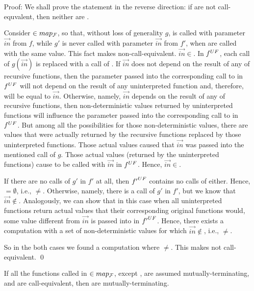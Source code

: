 \documentclass{llncs}
\begin{document}
Proof: We shall prove the statement in the reverse direction: if  are not call-equvalent, then neither are . 

Consider $\in map_{\cal F}$, so that, without loss of generality $g$, is called with parameter $\vec{in}$ from $f$, while $g'$ is never called with parameter $\vec{in}$ from $f'$, when  are called with the same value. This fact makes  non-call-equivalent. $\vec{in}\in$. In ${f}^{UF}$, each call of $g(\vec{in})$ is replaced with a call of . If $\vec{in}$ does not depend on the result of any of recursive functions, then the parameter passed into the corresponding call to  in ${f}^{UF}$ will not depend on the result of any uninterpreted function and, therefore, will be equal to $\vec{in}$. Otherwise, namely, $\vec{in}$ depends on the result of any of recursive functions, then non-deterministic values returned by uninterpreted functions will influence the parameter passed into the corresponding call to  in ${f}^{UF}$. But among all the possibilities for those non-deterministic values, there are values that were actually returned by the recursive functions replaced by those uninterpreted functions. Those actual values caused that $\vec{in}$ was passed into the mentioned call of $g$. Those actual values (returned by the uninterpreted functions) cause  to be called with $\vec{in}$ in ${f}^{UF}$. Hence, $\vec{in}\in$. 

If there are no calls of $g'$ in $f'$ at all, then ${f'}^{UF}$ contains no calls of  either. Hence, $=\emptyset$, i.e., $\neq$. 
Otherwise, namely, there is a call of $g'$ in $f'$, but we know that $\vec{in} \notin $.
Analogously, we can show that in this case when all uninterpreted functions return actual values that their corresponding original functions would, some value different from $\vec{in}$ is passed into  in ${f'}^{UF}$. Hence, there exists a computation with a set of non-deterministic values for which $\vec{in}\notin$, i.e., $\neq$.

So in the both cases we found a computation where $\neq$. This makes  not call-equivalent. \qed


\begin{lemma}If all the functions called in $\in map_{\cal F}$, except , are assumed mutually-terminating, and  are call-equivalent, then  are mutually-terminating.
\end{lemma}
\end{document}
